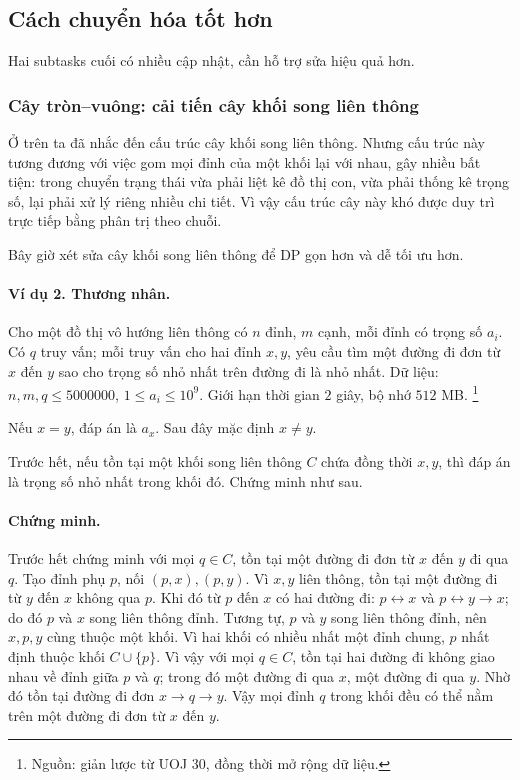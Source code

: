\documentclass[11pt]{article}
\begin{document}
\subsection{Cách chuyển hóa tốt hơn}

Hai subtasks cuối có nhiều cập nhật, cần hỗ trợ sửa hiệu quả hơn.

\subsubsection{Cây tròn--vuông: cải tiến cây khối song liên thông}

Ở trên ta đã nhắc đến cấu trúc cây khối song liên thông. Nhưng cấu trúc này
tương đương với việc gom mọi đỉnh của một khối lại với nhau, gây nhiều bất
tiện: trong chuyển trạng thái vừa phải liệt kê đồ thị con, vừa phải thống kê
trọng số, lại phải xử lý riêng nhiều chi tiết. Vì vậy cấu trúc cây này khó
được duy trì trực tiếp bằng phân trị theo chuỗi.

Bây giờ xét sửa cây khối song liên thông để DP gọn hơn và dễ tối ưu hơn.

\paragraph{Ví dụ 2. Thương nhân.}
Cho một đồ thị vô hướng liên thông có \(n\) đỉnh, \(m\) cạnh, mỗi đỉnh có
trọng số \(a_i\). Có \(q\) truy vấn; mỗi truy vấn cho hai đỉnh \(x,y\), yêu
cầu tìm một đường đi đơn từ \(x\) đến \(y\) sao cho trọng số nhỏ nhất trên
đường đi là nhỏ nhất. Dữ liệu: \(n,m,q\le 5000000\),
\(1\le a_i\le 10^9\). Giới hạn thời gian \(2\) giây, bộ nhớ \(512\) MB.
\footnote{Nguồn: giản lược từ UOJ 30, đồng thời mở rộng dữ liệu.}

Nếu \(x=y\), đáp án là \(a_x\). Sau đây mặc định \(x\ne y\).

Trước hết, nếu tồn tại một khối song liên thông \(C\) chứa đồng thời \(x,y\),
thì đáp án là trọng số nhỏ nhất trong khối đó. Chứng minh như sau.

\paragraph{Chứng minh.}
Trước hết chứng minh với mọi \(q\in C\), tồn tại một đường đi đơn từ \(x\) đến
\(y\) đi qua \(q\). Tạo đỉnh phụ \(p\), nối \((p,x),(p,y)\). Vì \(x,y\) liên
thông, tồn tại một đường đi từ \(y\) đến \(x\) không qua \(p\). Khi đó từ
\(p\) đến \(x\) có hai đường đi: \(p\leftrightarrow x\) và
\(p\leftrightarrow y\to x\); do đó \(p\) và \(x\) song liên thông đỉnh.
Tương tự, \(p\) và \(y\) song liên thông đỉnh, nên \(x,p,y\) cùng thuộc một
khối. Vì hai khối có nhiều nhất một đỉnh chung, \(p\) nhất định thuộc khối
\(C\cup\{p\}\). Vì vậy với mọi \(q\in C\), tồn tại hai đường đi không giao
nhau về đỉnh giữa \(p\) và \(q\); trong đó một đường đi qua \(x\), một đường
đi qua \(y\). Nhờ đó tồn tại đường đi đơn \(x\to q\to y\). Vậy mọi
đỉnh \(q\) trong khối đều có thể nằm trên một đường đi đơn từ \(x\) đến \(y\).
\end{document}
